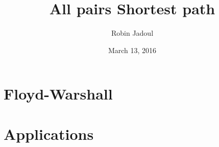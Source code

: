 \documentclass{beamer}
\title{All pairs Shortest path}
\author{Robin Jadoul}
\date{March 13, 2016}
\institute
{
    \texttt{[image: ../share/beoi-logo.png]}
}
\begin{document}
\frame{\titlepage}

\section[Floyd-Warshall]{Floyd-Warshall}


\section[Applications]{Applications}

\end{document}
